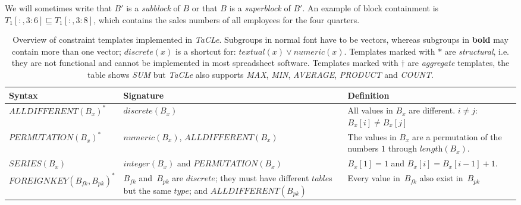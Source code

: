 \documentclass{IEEEtran}
\newcommand{\PADSEP}{-7pt}
\newcommand{\luc}[1]{\textcolor{red}{{\sc Luc:} #1}\xspace}
\newcommand{\format}[1]{\textit{#1}\xspace}
\newcommand{\sname}{\format{TaCLe}}
\newcommand{\CName}{Syntax\xspace}
\newcommand{\CSignature}{Signature\xspace}
\newcommand{\CFunction}{Definition\xspace}
\newcommand{\rangeto}[2]{#1{:}#2}
\newcommand{\ecfkey}[2]{\ensuremath{\textit{FOREIGNKEY}(#1,#2)}}
\newcommand{\ecalldiff}[1]{\ensuremath{\textit{ALLDIFFERENT}(#1)}}
\newcommand{\ecperm}[1]{\ensuremath{\textit{PERMUTATION}(#1)}}
\newcommand{\ecseries}[1]{\ensuremath{\textit{SERIES}(#1)}}
\newcommand{\numeric}{\format{numeric}}
\newcommand{\textual}{\format{textual}}
\newcommand{\integer}{\format{integer}}
\newcommand{\discrete}{\format{discrete}}
\newcommand{\plength}{\format{length}}
\newcommand{\ptype}{\format{type}}
\newcommand{\ptable}{\format{table}}
\newcommand{\sbs}{B}
\newcommand{\sbl}[1]{\ensuremath{\sbs_{\textit{#1}}}}
\theoremstyle{definition}
\begin{document}
We will sometimes write that $B'$ is a \textit{subblock} of $B$ or that $B$ is a \textit{superblock} of $B'$.
%
An example of block containment is $T_1[:,\rangeto{3}{6}] \sqsubseteq T_1[:,\rangeto{3}{8}] $, which contains the sales numbers of all employees for the four quarters.


\begin{table}[!h]
\caption{
  Overview of constraint templates implemented in \sname.
  Subgroups in normal font have to be vectors, whereas subgroups in \textbf{bold} may contain more than one vector;
  $\discrete(x)$ is a shortcut for: $\textual(x) \lor \numeric(x)$.
  Templates marked with $*$ are \textit{structural}, i.e. they are not functional and cannot be implemented in most spreadsheet software.
  Templates marked with $\dagger$ are \textit{aggregate} templates, the table shows \textit{SUM} but \sname also supports \textit{MAX}, \textit{MIN}, \textit{AVERAGE}, \textit{PRODUCT} and \textit{COUNT}.
}
\label{table:constraints}
  {\centering
  \begin{tabularx}{\textwidth}{l X X}
    \textbf{\CName} & \textbf{\CSignature} & \textbf{\CFunction}\\ \hline \hline
    $\ecalldiff{\sbl{x}}^*$
      & $\discrete(\sbl{x})$
      
      & All values in $\sbl{x}$ are different. $i \neq j$: $\sbl{x}[i] \neq \sbl{x}[j]$
      \\[\PADSEP] \hline

    $\ecperm{\sbl{x}}^*$
      & $\numeric(\sbl{x})$, $\ecalldiff{\sbl{x}}$
      
      & The values in $\sbl{x}$ are a permutation of the numbers $1$ through $\plength(\sbl{x})$.
      \\ \hline

    \ecseries{\sbl{x}}
      & $\integer(\sbl{x})$ and $\ecperm{\sbl{x}}$
      
      & $\sbl{x}[1] = 1$ and $\sbl{x}[i] = \sbl{x}[i - 1] + 1$.
      \\[\PADSEP] \hline

    $\ecfkey{\sbl{fk}}{\sbl{pk}}^*$
      & $\sbl{fk}$ and~$\sbl{pk}$ are $\discrete$; they must have different $\ptable$s but the same $\ptype$; and $\ecalldiff{\sbl{pk}}$

      & Every value in~$\sbl{fk}$ also exist in~$\sbl{pk}$ \\[\PADSEP] \hline


\end{tabularx}}
\end{table}
\end{document}
